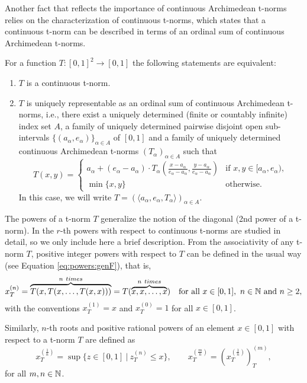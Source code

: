 Another fact that reflects the importance of continuous Archimedean t-norms relies on the characterization of continuous t-norms, which states that a continuous t-norm can be described in terms of an ordinal sum of continuous Archimedean t-norms.

\begin{theorem}\label{th:characcontt-norm}
	For a function $T:[0,1]^2 \to [0,1]$ the following statements are equivalent:
	\begin{enumerate}[label=(\roman*)]
		\item $T$ is a continuous t-norm.
		\item $T$ is uniquely representable as an ordinal sum of continuous Archimedean t-norms, i.e., there exist a uniquely determined (finite or countably infinite) index set $A$, a family of uniquely determined pairwise disjoint open sub-intervals $\{(a_{\alpha},e_{\alpha})\}_{\alpha \in A}$ of $[0,1]$ and a family of uniquely determined continuous Archimedean t-norms $(T_{\alpha})_{\alpha \in A}$ such that
		$$T(x,y)
		=
		\left\{\begin{array}{ll}
			a_{\alpha}+(e_{\alpha}-a_{\alpha})\cdot T_{\alpha}\left(\frac{x-a_{\alpha}}{e_{\alpha}-a_{\alpha}},\frac{y-a_{\alpha}}{e_{\alpha}-a_{\alpha}}\right) & \text{if } x,y \in [a_{\alpha},e_{\alpha}), \\
			\min\{x,y\} & \text{otherwise.}
		\end{array}
		\right.
		$$
		In this case, we will write $T=(\langle a_{\alpha},e_{\alpha},T_{\alpha}\rangle)_{\alpha \in A}$.
	\end{enumerate}
\end{theorem}

The powers of a t-norm $T$ generalize the notion of the diagonal (2nd power of a t-norm). In {\cite{Walker2002}} the $r$-th powers with respect to continuous t-norms are studied in detail, so we only include here  a brief description. From the associativity of any t-norm $T$, positive integer powers with respect to $T$ can be defined in the usual way (see Equation \ref{eq:powers:genF}), that is,
$$x_T^{(n)} = \overbrace{T(x,T(x,\dots,T(x,x)))}^{n \ times} = T(\overbrace{x,x,\ldots,x}^{n \ times}) \quad \text{for all} \  x\in[0,1], \ n\in \mathbb{N} \text{ and } n\geq 2,$$
with the conventions $x_T^{(1)}=x$ and  $x_T^{(0)}=1$ for all $x \in [0,1]$.

Similarly, $n$-th roots and positive rational powers of an element $x \in [0,1]$ with respect to a t-norm $T$ are defined as
\[
x_T^{\left(\frac{1}{n}\right)}=\sup\{z \in [0,1] \ | \ z_T^{(n)}\leq x\}, \qquad  x_T^{\left(\frac{m}{n}\right)}=\left(x_T^{\left(\frac{1}{n}\right)}\right)_T^{(m)},
\]
for all $m,n \in \mathbb{N}$.

